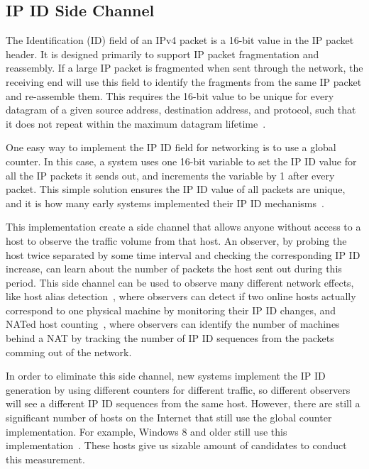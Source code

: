 \subsection{IP ID Side Channel}
\label{sec:ipidchannel}
The Identification (ID) field of an IPv4 packet is a 16-bit value in the IP
packet header. It is designed primarily to support IP packet fragmentation
and reassembly. If a large IP packet is fragmented when sent through the
network, the receiving end will use this field to identify the fragments from
the same IP packet and re-assemble them. This requires the 16-bit value to be
unique for every datagram of a given source address, destination address, and
protocol, such that it does not repeat within the maximum datagram
lifetime~\cite{postel1981rfc0791}.

One easy way to implement the IP ID field for networking is to use a global
counter. In this case, a system uses one 16-bit variable to set the IP ID
value for all the IP packets it sends out, and increments the variable by 1
after every packet. This simple solution ensures the IP ID value of all
packets are unique, and it is how many early systems implemented their
IP ID mechanisms~\cite{klein2019ip}.

This implementation create a side channel that allows anyone without
access to a host to observe the traffic volume from that host. An observer,
by probing the host twice separated by some time interval and checking the
corresponding IP ID increase, can learn about the number of packets the host
sent out during this period. This side channel can be used to observe many
different network effects, like host alias detection~\cite{spring2002measuring},
where observers can detect if two online hosts actually correspond to one 
physical machine by monitoring their IP ID changes, and NATed host 
counting~\cite{bellovin2002technique}, where observers can identify the 
number of machines behind a NAT by tracking the number of IP ID sequences 
from the packets comming out of the network.

In order to eliminate this side channel, new systems implement the IP ID
generation by using different counters for different traffic, so different
observers will see a different IP ID sequences from the same host. However,
there are still a significant number of hosts on the Internet that still use
the global counter implementation. For example, Windows 8 and older still use
this implementation~\cite{klein2019ip}. These hosts give us sizable amount of
candidates to conduct this measurement.